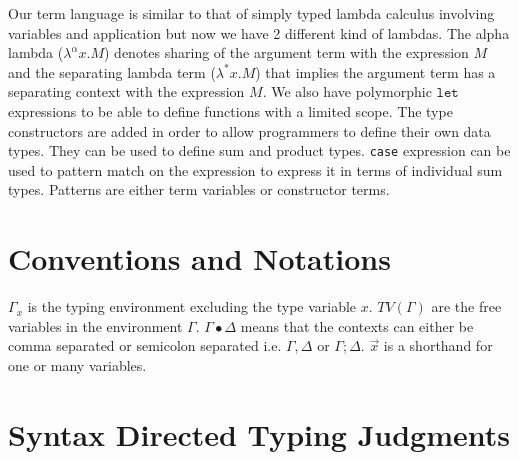Our term language is similar to that of simply typed lambda calculus involving variables and application
but now we have 2 different kind of lambdas. The alpha lambda ($\lambda^{\alpha} x. M$) denotes sharing
of the argument term with the expression $M$ and the separating lambda term ($\lambda^{*} x. M$) that implies
the argument term has a separating context with the expression $M$. We also have polymorphic $\texttt{let}$
expressions to be able to define functions with a limited scope. The type constructors are added
in order to allow programmers to define their own data types. They can be used to define sum and product types.
\texttt{case} expression can be used to pattern match on the expression to express it in terms
of individual sum types. Patterns are either term variables or constructor terms.


\section{Conventions and Notations}
$\Gamma_{x}$ is the typing environment excluding the type variable $x$. $TV(\Gamma)$ are the free
variables in the environment $\Gamma$. $\Gamma \bullet \Delta$ means that the contexts can either
be comma separated or semicolon separated i.e. $\Gamma, \Delta$ or $\Gamma;\Delta$. $\vec{x}$ is a shorthand for
one or many variables.

\section{Syntax Directed Typing Judgments}

